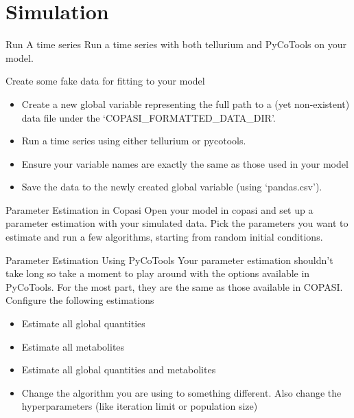 \documentclass[../../main]{subfiles}
\begin{document}
\section{Simulation}

\begin{Task}[label=TimeSeries]{Run A time series}
Run a time series with both tellurium and PyCoTools on your model.
\end{Task}

\begin{Task}[label=CreateFakeData]{Create some fake data for fitting to your model}
    \begin{itemize}
        \item Create a new global variable representing the full path to a (yet non-existent) data file under the `COPASI\_FORMATTED\_DATA\_DIR'.
        \item Run a time series using either tellurium or pycotools.
        \item Ensure your variable names are exactly the same as those used in your model
        \item Save the data to the newly created global variable (using `pandas.csv').
    \end{itemize}
\end{Task}

\begin{Task}[label=ManualParameterEstimation]{Parameter Estimation in Copasi}
    Open your model in copasi and set up a parameter estimation with your simulated data. Pick the
    parameters you want to estimate and run a few algorithms, starting from random initial conditions.
\end{Task}

\begin{Task}[label=AutoParameterEstimation]{Parameter Estimation Using PyCoTools}
    Your parameter estimation shouldn't take long so take a moment to
    play around with the options available in PyCoTools. For the most part, they are the same as those available in COPASI.
    Configure the following estimations
    \begin{itemize}
        \item Estimate all global quantities
        \item Estimate all metabolites
        \item Estimate all global quantities and metabolites
        \item Change the algorithm you are using to something different. Also change the hyperparameters (like iteration limit or population size)
    \end{itemize}
\end{Task}
\end{document}
